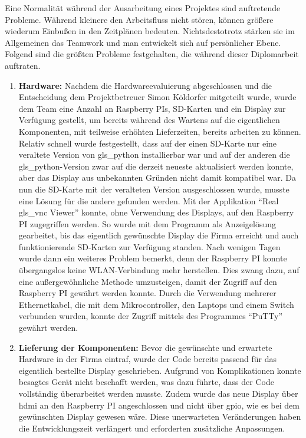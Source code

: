 Eine Normalität während der Ausarbeitung eines Projektes sind auftretende Probleme. Während kleinere den Arbeitsfluss nicht stören, können größere wiederum Einbußen in den Zeitplänen bedeuten. Nichtsdestotrotz stärken sie im Allgemeinen das Teamwork und man entwickelt sich auf persönlicher Ebene.\\ Folgend sind die größten Probleme festgehalten, die während dieser Diplomarbeit auftraten.

\begin{enumerate}

	\item \textbf{Hardware:} Nachdem die Hardwareevaluierung abgeschlossen und die Entscheidung dem Projektbetreuer Simon Köldorfer mitgeteilt wurde, wurde dem Team eine Anzahl an Raspberry PIs, SD-Karten und ein Display zur Verfügung gestellt, um bereits während des Wartens auf die eigentlichen Komponenten, mit teilweise erhöhten Lieferzeiten, bereits arbeiten zu können. Relativ schnell wurde festgestellt, dass auf der einen SD-Karte nur eine veraltete Version von \gls{gls_python} installierbar war und auf der anderen die \gls{gls_python}-Version zwar auf die derzeit neueste aktualisiert werden konnte, aber das Display aus unbekannten Gründen nicht damit kompatibel war. Da nun die SD-Karte mit der veralteten Version ausgeschlossen wurde, musste eine Lösung für die andere gefunden werden. Mit der Applikation \enquote{Real \gls{gls_vnc} Viewer} konnte, ohne Verwendung des Displays, auf den Raspberry PI zugegriffen werden. So wurde mit dem Programm als Anzeigelösung gearbeitet, bis das eigentlich gewünschte Display die Firma erreicht und auch funktionierende SD-Karten zur Verfügung standen. Nach wenigen Tagen wurde dann ein weiteres Problem bemerkt, denn der Raspberry PI konnte übergangslos keine WLAN-Verbindung mehr herstellen. Dies zwang dazu, auf eine außergewöhnliche Methode umzusteigen, damit der Zugriff auf den Raspberry PI gewährt werden konnte. Durch die Verwendung mehrerer Ethernetkabel, die mit dem Mikrocontroller, den Laptops und einem Switch verbunden wurden, konnte der Zugriff mittels des Programmes \enquote{PuTTy} gewährt werden.
	\item \textbf{Lieferung der Komponenten:} Bevor die gewünschte und erwartete Hardware in der Firma eintraf, wurde der Code bereits passend für das eigentlich bestellte Display geschrieben. Aufgrund von Komplikationen konnte besagtes Gerät nicht beschafft werden, was dazu führte, dass der Code vollständig überarbeitet werden musste. Zudem wurde das neue Display über \ac{hdmi} an den Raspberry PI angeschlossen und nicht über \ac{gpio}, wie es bei dem gewünschten Display gewesen wäre. Diese unerwarteten Veränderungen haben die Entwicklungszeit verlängert und erforderten zusätzliche Anpassungen.

\end{enumerate}
